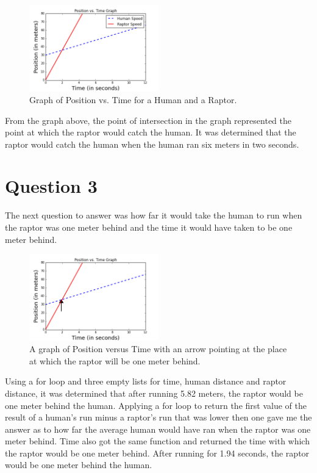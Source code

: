 \documentclass[twocolumn]{revtex4}
\begin{document}
\begin{figure}[h]
	\centering
	\includegraphics[width=0.5\textwidth]{CSISFinalProject1.png}
	\caption{Graph of Position vs. Time for a Human and a Raptor. \label{fig:Graph}}
\end{figure}

From the graph above, the point of intersection in the graph represented the point at which the raptor would catch the human. It was determined that the raptor would catch the human when the human ran six meters in two seconds. 
\section{Question 3} 
The next question to answer was how far it would take the human to run when the raptor was one meter behind and the time it would have taken to be one meter behind. 

\begin{figure}[h]
	\centering
	\includegraphics[width=0.5\textwidth]{CSISFinalProject2.png}
	\caption{A graph of Position versus Time with an arrow pointing at the place at which the raptor will be one meter behind.} \label{graph}
\end{figure}

Using a for loop and three empty lists for time, human distance and raptor distance, it was determined that after running 5.82 meters, the raptor would be one meter behind the human. Applying a for loop to return the first value of the result of a human's run minus a raptor's run that was lower then one gave me the answer as to how far the average human would have ran when the raptor was one meter behind. Time also got the same function and returned the time with which the raptor would be one meter behind. After running for 1.94 seconds, the raptor would be one meter behind the human. 
\end{document}
